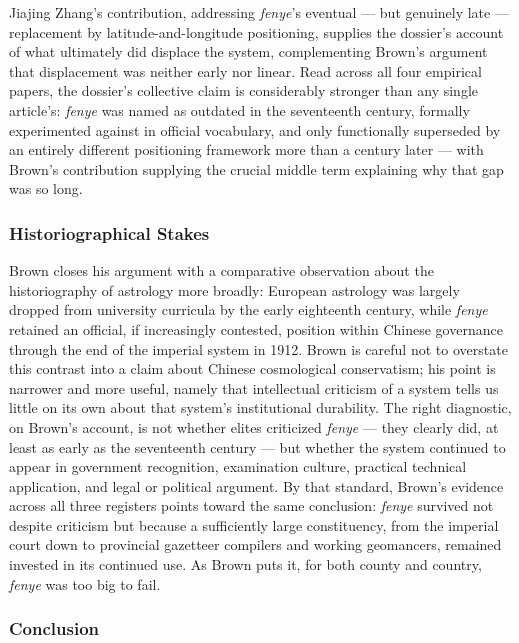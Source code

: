 \documentclass[10pt]{article}
\begin{document}
Jiajing Zhang's contribution, addressing \emph{fenye}'s eventual --- but genuinely late --- replacement by latitude-and-longitude positioning, supplies the dossier's account of what ultimately did displace the system, complementing Brown's argument that displacement was neither early nor linear. Read across all four empirical papers, the dossier's collective claim is considerably stronger than any single article's: \emph{fenye} was named as outdated in the seventeenth century, formally experimented against in official vocabulary, and only functionally superseded by an entirely different positioning framework more than a century later --- with Brown's contribution supplying the crucial middle term explaining why that gap was so long.

\subsubsection*{Historiographical Stakes}

Brown closes his argument with a comparative observation about the historiography of astrology more broadly: European astrology was largely dropped from university curricula by the early eighteenth century, while \emph{fenye} retained an official, if increasingly contested, position within Chinese governance through the end of the imperial system in 1912. Brown is careful not to overstate this contrast into a claim about Chinese cosmological conservatism; his point is narrower and more useful, namely that intellectual criticism of a system tells us little on its own about that system's institutional durability. The right diagnostic, on Brown's account, is not whether elites criticized \emph{fenye} --- they clearly did, at least as early as the seventeenth century --- but whether the system continued to appear in government recognition, examination culture, practical technical application, and legal or political argument. By that standard, Brown's evidence across all three registers points toward the same conclusion: \emph{fenye} survived not despite criticism but because a sufficiently large constituency, from the imperial court down to provincial gazetteer compilers and working geomancers, remained invested in its continued use. As Brown puts it, for both county and country, \emph{fenye} was too big to fail.

\subsubsection*{Conclusion}
\end{document}
